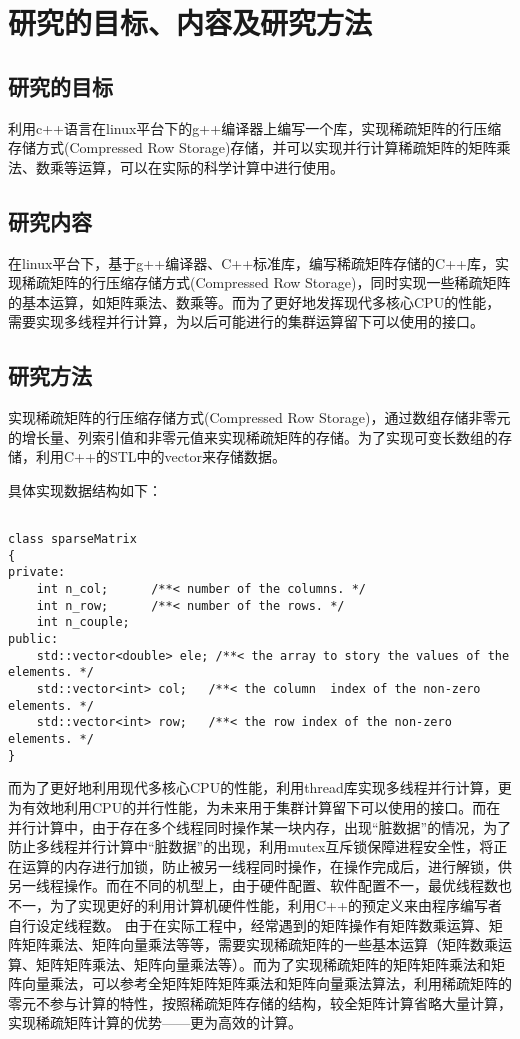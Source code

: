 \chapter{研究的目标、内容及研究方法}
\section{研究的目标}
利用c++语言在linux平台下的g++编译器上编写一个库，实现稀疏矩阵的行压缩存储方式(Compressed Row Storage)存储，并可以实现并行计算稀疏矩阵的矩阵乘法、数乘等运算，可以在实际的科学计算中进行使用。
 \section{研究内容}
  在linux平台下，基于g++编译器、C++标准库，编写稀疏矩阵存储的C++库，实现稀疏矩阵的行压缩存储方式(Compressed Row Storage)，同时实现一些稀疏矩阵的基本运算，如矩阵乘法、数乘等。而为了更好地发挥现代多核心CPU的性能，需要实现多线程并行计算，为以后可能进行的集群运算留下可以使用的接口。
  
  \section{研究方法}
  实现稀疏矩阵的行压缩存储方式(Compressed Row Storage)，通过数组存储非零元的增长量、列索引值和非零元值来实现稀疏矩阵的存储。为了实现可变长数组的存储，利用C++的STL中的vector来存储数据。
  
  具体实现数据结构如下：
  \begin{lstlisting}

class sparseMatrix
{
private:
    int n_col;		/**< number of the columns. */
    int n_row;		/**< number of the rows. */
    int n_couple;
public:
    std::vector<double> ele; /**< the array to story the values of the elements. */
    std::vector<int> col;	/**< the column  index of the non-zero elements. */
    std::vector<int> row;	/**< the row index of the non-zero elements. */
}
\end{lstlisting}

而为了更好地利用现代多核心CPU的性能，利用thread库实现多线程并行计算，更为有效地利用CPU的并行性能，为未来用于集群计算留下可以使用的接口。而在并行计算中，由于存在多个线程同时操作某一块内存，出现“脏数据”的情况，为了防止多线程并行计算中“脏数据”的出现，利用mutex互斥锁保障进程安全性，将正在运算的内存进行加锁，防止被另一线程同时操作，在操作完成后，进行解锁，供另一线程操作。而在不同的机型上，由于硬件配置、软件配置不一，最优线程数也不一，为了实现更好的利用计算机硬件性能，利用C++的预定义来由程序编写者自行设定线程数。
\newline
由于在实际工程中，经常遇到的矩阵操作有矩阵数乘运算、矩阵矩阵乘法、矩阵向量乘法等等，需要实现稀疏矩阵的一些基本运算（矩阵数乘运算、矩阵矩阵乘法、矩阵向量乘法等）。而为了实现稀疏矩阵的矩阵矩阵乘法和矩阵向量乘法，可以参考全矩阵矩阵矩阵乘法和矩阵向量乘法算法，利用稀疏矩阵的零元不参与计算的特性，按照稀疏矩阵存储的结构，较全矩阵计算省略大量计算，实现稀疏矩阵计算的优势——更为高效的计算。

